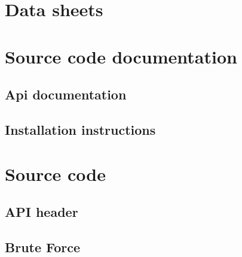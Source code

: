 \begin{appendices}
\appendix

\chapter{Data sheets}





\chapter{Source code documentation}

\section{Api documentation} %
\label{sec:api_documentation}



\section{Installation instructions} %
\label{sec:installation_instructions}





\chapter{Source code}

\section{API header} %
\label{sec:api_header}




\section{Brute Force} %
\label{sec:brute_force_garcia}


\end{appendices}
